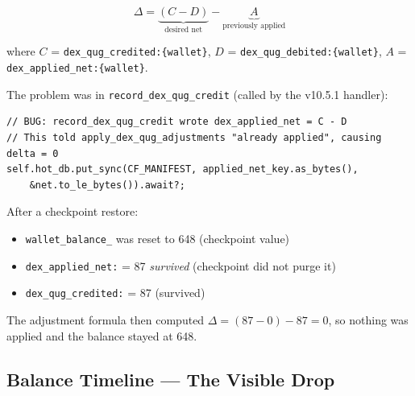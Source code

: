 \documentclass[11pt,a4paper]{article}
\begin{document}
\[
  \Delta = \underbrace{(C - D)}_{\text{desired net}} -
           \underbrace{A}_{\text{previously applied}}
\]

where $C$ = \texttt{dex\_qug\_credited:\{wallet\}},
$D$ = \texttt{dex\_qug\_debited:\{wallet\}},
$A$ = \texttt{dex\_applied\_net:\{wallet\}}.

The problem was in \texttt{record\_dex\_qug\_credit} (called by the
v10.5.1 handler):

\begin{lstlisting}[caption={Broken write in \texttt{record\_dex\_qug\_credit} (pre-v10.5.2)},
                   label={lst:broken}]
// BUG: record_dex_qug_credit wrote dex_applied_net = C - D
// This told apply_dex_qug_adjustments "already applied", causing delta = 0
self.hot_db.put_sync(CF_MANIFEST, applied_net_key.as_bytes(),
    &net.to_le_bytes()).await?;
\end{lstlisting}

After a checkpoint restore:
\begin{itemize}
  \item \texttt{wallet\_balance\_} was reset to 648 (checkpoint value)
  \item \texttt{dex\_applied\_net:} = 87 \emph{survived} (checkpoint did not purge it)
  \item \texttt{dex\_qug\_credited:} = 87 (survived)
\end{itemize}

The adjustment formula then computed $\Delta = (87 - 0) - 87 = 0$, so nothing
was applied and the balance stayed at 648.

\subsection{Balance Timeline — The Visible Drop}
\end{document}
